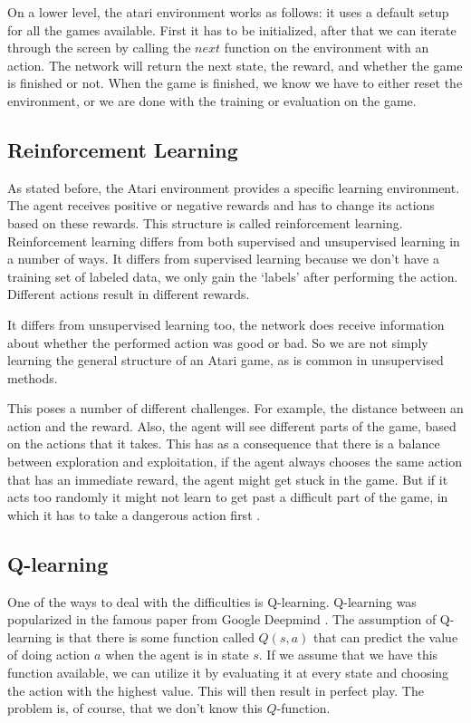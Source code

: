 \documentclass{article}
\begin{document}
On a lower level, the atari environment works as follows: it uses a default setup for all the games available. First it has to be initialized, after that we can iterate through the screen by calling the $next$ function on the environment with an action. The network will return the next state, the reward, and whether the game is finished or not. When the game is finished, we know we have to either reset the environment, or we are done with the training or evaluation on the game.

\subsection{Reinforcement Learning}

As stated before, the Atari environment provides a specific learning environment. The agent receives positive or negative rewards and has to change its actions based on these rewards. This structure is called reinforcement learning. Reinforcement learning differs from both supervised and unsupervised learning in a number of ways. It differs from supervised learning because we don't have a training set of labeled data, we only gain the `labels' after performing the action. Different actions result in different rewards.

It differs from unsupervised learning too, the network does receive information about whether the performed action was good or bad. So we are not simply learning the general structure of an Atari game, as is common in unsupervised methods.

This poses a number of different challenges. For example, the distance between an action and the reward. Also, the agent will see different parts of the game, based on the actions that it takes. This has as a consequence that there is a balance between exploration and exploitation, if the agent always chooses the same action that has an immediate reward, the agent might get stuck in the game. But if it acts too randomly it might not learn to get past a difficult part of the game, in which it has to take a dangerous action first \cite{reinforcementLearningDraft}.

\subsection{Q-learning}

One of the ways to deal with the difficulties is Q-learning. Q-learning was popularized in the famous paper from Google Deepmind \cite{chainer_learningsys2015}. The assumption of Q-learning is that there is some function called $Q(s, a)$ that can predict the value of doing action $a$ when the agent is in state $s$. If we assume that we have this function available, we can utilize it by evaluating it at every state and choosing the action with the highest value. This will then result in perfect play. The problem is, of course, that we don't know this $Q$-function. 
\end{document}
